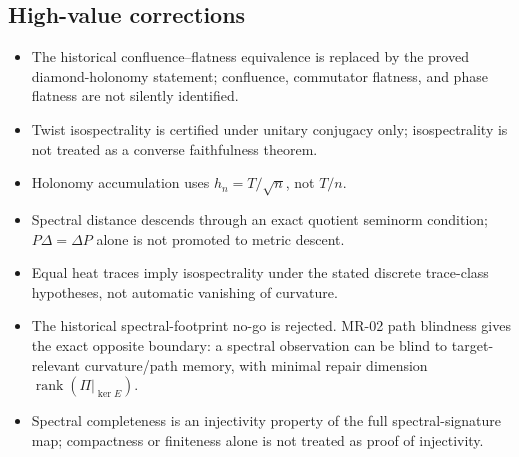 \documentclass[12pt, oneside]{article}
\begin{document}
\subsection{High-value corrections}
\begin{itemize}
\item The historical confluence--flatness equivalence is replaced by the proved diamond-holonomy statement; confluence, commutator flatness, and phase flatness are not silently identified.
\item Twist isospectrality is certified under unitary conjugacy only; isospectrality is not treated as a converse faithfulness theorem.
\item Holonomy accumulation uses $h_n=T/\sqrt n$, not $T/n$.
\item Spectral distance descends through an exact quotient seminorm condition; $P\Delta=\Delta P$ alone is not promoted to metric descent.
\item Equal heat traces imply isospectrality under the stated discrete trace-class hypotheses, not automatic vanishing of curvature.
\item The historical spectral-footprint no-go is rejected. MR-02 path blindness gives the exact opposite boundary: a spectral observation can be blind to target-relevant curvature/path memory, with minimal repair dimension $\operatorname{rank}(\Pi|_{\ker E})$.
\item Spectral completeness is an injectivity property of the full spectral-signature map; compactness or finiteness alone is not treated as proof of injectivity.
\end{itemize}
\end{document}
